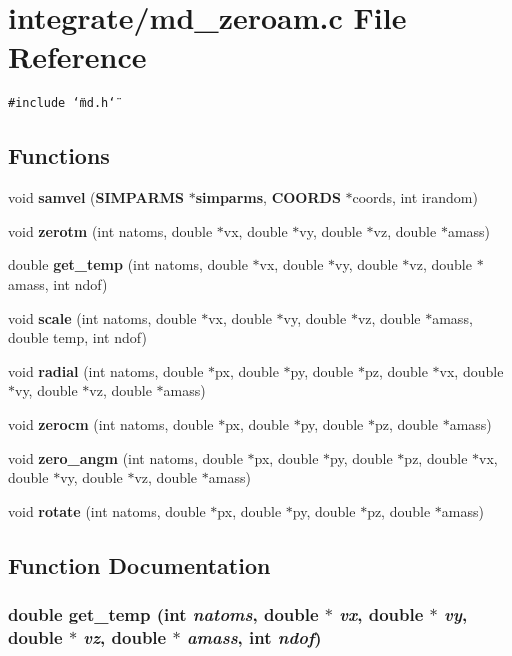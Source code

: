 \section{integrate/md\_\-zeroam.c File Reference}
\label{md__zeroam_8c}
{\tt \#include \char`\"{}md.h\char`\"{}}\par
\subsection*{Functions}
\begin{CompactItemize}
\item 
void {\bf samvel} ({\bf SIMPARMS} $\ast${\bf simparms}, {\bf COORDS} $\ast$coords, int irandom)
\item 
void {\bf zerotm} (int natoms, double $\ast$vx, double $\ast$vy, double $\ast$vz, double $\ast$amass)
\item 
double {\bf get\_\-temp} (int natoms, double $\ast$vx, double $\ast$vy, double $\ast$vz, double $\ast$amass, int ndof)
\item 
void {\bf scale} (int natoms, double $\ast$vx, double $\ast$vy, double $\ast$vz, double $\ast$amass, double temp, int ndof)
\item 
void {\bf radial} (int natoms, double $\ast$px, double $\ast$py, double $\ast$pz, double $\ast$vx, double $\ast$vy, double $\ast$vz, double $\ast$amass)
\item 
void {\bf zerocm} (int natoms, double $\ast$px, double $\ast$py, double $\ast$pz, double $\ast$amass)
\item 
void {\bf zero\_\-angm} (int natoms, double $\ast$px, double $\ast$py, double $\ast$pz, double $\ast$vx, double $\ast$vy, double $\ast$vz, double $\ast$amass)
\item 
void {\bf rotate} (int natoms, double $\ast$px, double $\ast$py, double $\ast$pz, double $\ast$amass)
\end{CompactItemize}


\subsection{Function Documentation}
\subsubsection{\setlength{\rightskip}{0pt plus 5cm}double get\_\-temp (int {\em natoms}, double $\ast$ {\em vx}, double $\ast$ {\em vy}, double $\ast$ {\em vz}, double $\ast$ {\em amass}, int {\em ndof})}\label{md__zeroam_8c_3194840753ffa24a42a22c40022d3491}


